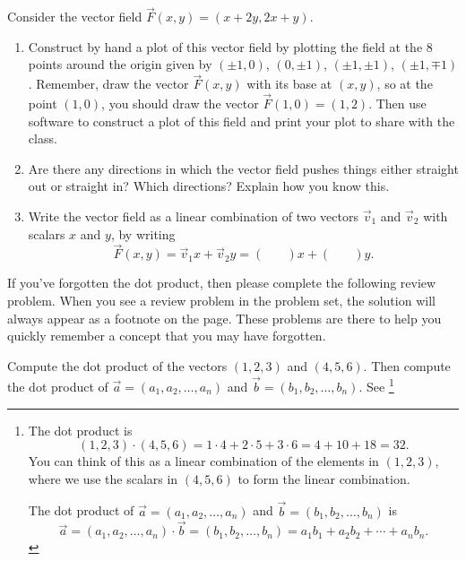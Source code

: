 \begin{problem}\label{linear combination first vector field}
 Consider the vector field $\vec F(x,y) = (x+2y,2x+y)$.  
\begin{enumerate}
 \item Construct by hand a plot of this vector field by plotting the field at the 8 points around the origin given by 
$(\pm 1, 0)$, 
$(0, \pm 1)$, 
$(\pm 1, \pm 1)$, 
$(\pm 1, \mp 1)$.  
Remember, draw the vector $\vec F(x,y)$ with its base at $(x,y)$, so at the point $(1,0)$, you should draw the vector $\vec F(1,0) = (1,2)$.  %
Then use software to construct a plot of this field and print your plot to share with the class.  
 \item Are there any directions in which the vector field pushes things either straight out or straight in?  Which directions? Explain how you know this.
 \item
 Write the vector field as a linear combination of two vectors $\vec v_1$ and $\vec v_2$ with scalars $x$ and $y$, by writing
$$\vec F(x,y) = \vec v_1 x+\vec v_2 y = 
\begin{pmatrix}
 \quad\\ \quad
\end{pmatrix}
x+
\begin{pmatrix}
\quad \\ \
\end{pmatrix}
y.$$
\end{enumerate}

\end{problem}



If you've forgotten the dot product, then please complete the following review problem. When you see a review problem in the problem set, the solution will always appear as a footnote on the page.  These problems are there to help you quickly remember a concept that you may have forgotten.



\begin{review*}
Compute the dot product of the vectors $(1,2,3)$ and $(4,5,6)$.  Then compute the dot product of 
$\vec a = (a_1,a_2,\ldots, a_n)$ and 
$\vec b = (b_1,b_2,\ldots, b_n)$.  See \footnote{
The dot product is $$(1,2,3)\cdot(4,5,6) = 1\cdot 4+2\cdot 5+3\cdot 6 = 4+10+18=32.$$ You can think of this as a linear combination of the elements in $(1,2,3)$, where we use the scalars in $(4,5,6)$ to form the linear combination.  

The dot product of
$\vec a = (a_1,a_2,\ldots, a_n)$ and 
$\vec b = (b_1,b_2,\ldots, b_n)$ is
$$\vec a = (a_1,a_2,\ldots, a_n)\cdot\vec b = (b_1,b_2,\ldots, b_n)
=a_1b_1+a_2b_2+\cdots+a_nb_n.
$$
} 
\end{review*}



